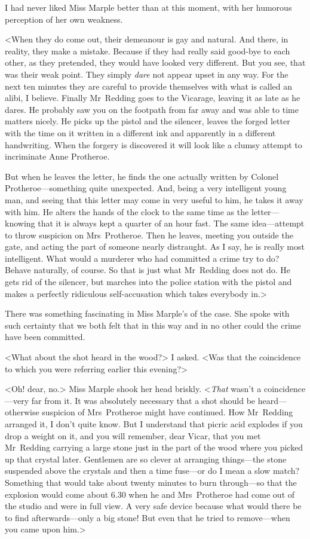 I had never liked Miss Marple better than at this moment, with her humorous perception of her own weakness.

<When they do come out, their demeanour is gay and natural. And there, in reality, they make a mistake. Because if they had really said good-bye to each other, as they pretended, they would have looked very different. But you see, that was their weak point. They simply \emph{dare} not appear upset in any way. For the next ten minutes they are careful to provide themselves with what is called an alibi, I believe. Finally Mr~Redding goes to the Vicarage, leaving it as late as he dares. He probably saw you on the footpath from far away and was able to time matters nicely. He picks up the pistol and the silencer, leaves the forged letter with the time on it written in a different ink and apparently in a different handwriting. When the forgery is discovered it will look like a clumsy attempt to incriminate Anne Protheroe.

But when he leaves the letter, he finds the one actually written by Colonel Protheroe—something quite unexpected. And, being a very intelligent young man, and seeing that this letter may come in very useful to him, he takes it away with him. He alters the hands of the clock to the same time as the letter—knowing that it is always kept a quarter of an hour fast. The same idea—attempt to throw suspicion on Mrs~Protheroe. Then he leaves, meeting you outside the gate, and acting the part of someone nearly distraught. As I say, he is really most intelligent. What would a murderer who had committed a crime try to do? Behave naturally, of course. So that is just what Mr~Redding does not do. He gets rid of the silencer, but marches into the police station with the pistol and makes a perfectly ridiculous self-accusation which takes everybody in.>

There was something fascinating in Miss Marple's  of the case. She spoke with such certainty that we both felt that in this way and in no other could the crime have been committed.

<What about the shot heard in the wood?> I asked. <Was that the coincidence to which you were referring earlier this evening?>

<Oh! dear, no.> Miss Marple shook her head briskly. <\emph{That} wasn't a coincidence—very far from it. It was absolutely necessary that a shot should be heard—otherwise suspicion of Mrs~Protheroe might have continued. How Mr~Redding arranged it, I don't quite know. But I understand that picric acid explodes if you drop a weight on it, and you will remember, dear Vicar, that you met Mr~Redding carrying a large stone just in the part of the wood where you picked up that crystal later. Gentlemen are so clever at arranging things—the stone suspended above the crystals and then a time fuse—or do I mean a slow match? Something that would take about twenty minutes to burn through—so that the explosion would come about 6.30 when he and Mrs~Protheroe had come out of the studio and were in full view. A very safe device because what would there be to find afterwards—only a big stone! But even that he tried to remove—when you came upon him.>

